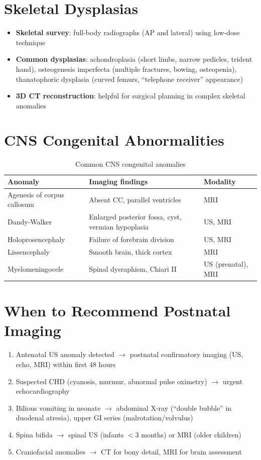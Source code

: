 \section{Skeletal Dysplasias}
\begin{itemize}
  \item \textbf{Skeletal survey}: full-body radiographs (AP and lateral) using low-dose technique
  \item \textbf{Common dysplasias}: achondroplasia (short limbs, narrow pedicles, trident hand), osteogenesis imperfecta (multiple fractures, bowing, osteopenia), thanatophoric dysplasia (curved femurs, ``telephone receiver'' appearance)
  \item \textbf{3D CT reconstruction}: helpful for surgical planning in complex skeletal anomalies
\end{itemize}

\section{CNS Congenital Abnormalities}

\begin{table}[h]
\centering
\caption{Common CNS congenital anomalies}
\begin{tabular}{|p{}|p{}|p{}|}
\hline
\textbf{Anomaly} & \textbf{Imaging findings} & \textbf{Modality} \\
\hline
Agenesis of corpus callosum & Absent CC, parallel ventricles & MRI \\
Dandy-Walker & Enlarged posterior fossa, cyst, vermian hypoplasia & US, MRI \\
Holoprosencephaly & Failure of forebrain division & US, MRI \\
Lissencephaly & Smooth brain, thick cortex & MRI \\
Myelomeningocele & Spinal dysraphism, Chiari II & US (prenatal), MRI \\
\hline
\end{tabular}
\end{table}

\section{When to Recommend Postnatal Imaging}
\begin{enumerate}
  \item Antenatal US anomaly detected $\rightarrow$ postnatal confirmatory imaging (US, echo, MRI) within first 48 hours
  \item Suspected CHD (cyanosis, murmur, abnormal pulse oximetry) $\rightarrow$ urgent echocardiography
  \item Bilious vomiting in neonate $\rightarrow$ abdominal X-ray (``double bubble'' in duodenal atresia), upper GI series (malrotation/volvulus)
  \item Spina bifida $\rightarrow$ spinal US (infants $<$3 months) or MRI (older children)
  \item Craniofacial anomalies $\rightarrow$ CT for bony detail, MRI for brain assessment
\end{enumerate}

